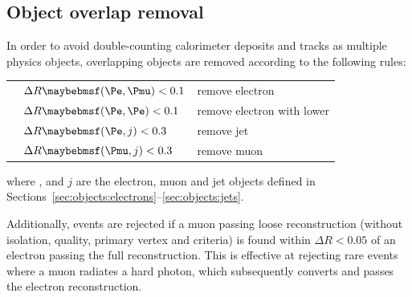 


\subsection{Object overlap removal}
\label{sec:objects:overlap}

In order to avoid double-counting calorimeter deposits and tracks as multiple physics 
objects, overlapping objects are removed according to the following rules:

\begin{listliketab}
	\begin{tabular}{Ll@{\hskip 0.3in}l}
		\textbullet & $\Delta R \parenths{\Pe,\Pmu} < 0.1$ & remove electron \\
		\textbullet & $\Delta R \parenths{\Pe,\Pe}  < 0.1$ & remove electron with lower \pt \\
		\textbullet & $\Delta R \parenths{\Pe,j}    < 0.3$ & remove jet \\
		\textbullet & $\Delta R \parenths{\Pmu,j}   < 0.3$ & remove muon \\
	\end{tabular}
\end{listliketab}

\noindent
where \Pe, \Pmu and $j$ are the electron, muon and jet objects defined in 
Sections~\ref{sec:objects:electrons}--\ref{sec:objects:jets}.

Additionally, events are rejected if a muon passing loose reconstruction (\ie without 
isolation, quality, primary vertex and \pt criteria) is found within $\Delta R < 0.05$ of 
an electron passing the full reconstruction. 
This is effective at rejecting rare \HepProcess{\PZ \HepTo \Pmu\Pmu} events where a muon 
radiates a hard photon, which subsequently converts and passes the electron reconstruction.
